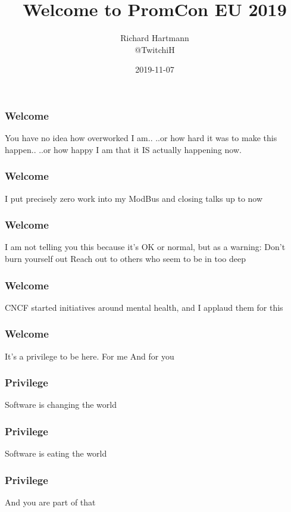 \documentclass[aspectratio=169]{beamer}
\title{Welcome to PromCon EU 2019}
\subtitle{}
\author{Richard Hartmann\\
@TwitchiH}
\date{2019-11-07}
\begin{document}



\begin{frame}
	\titlepage
\end{frame}

\begin{frame}
	\frametitle{Welcome}
	\centering
	\vfill
	You have no idea how overworked I am..
	\vfill
	..or how hard it was to make this happen..
	\vfill
	..or how happy I am that it IS actually happening now.
	\vfill
\end{frame}

\begin{frame}
	\frametitle{Welcome}
	\centering
	\vfill
	I put precisely zero work into my ModBus and closing talks up to now
	\vfill
\end{frame}

\begin{frame}
	\frametitle{Welcome}
	\centering
	\vfill
	I am not telling you this because it's OK or normal, but as a warning:
	\vfill
	Don't burn yourself out
	\vfill
	Reach out to others who seem to be in too deep
	\vfill
\end{frame}


\begin{frame}
	\frametitle{Welcome}
	\centering
	\vfill
	CNCF started initiatives around mental health, and I applaud them for this
	\vfill
\end{frame}
\begin{frame}
	\frametitle{Welcome}
	\centering
	\vfill
	It's a privilege to be here.
	\vfill
	For me
	\vfill
	And for you
	\vfill
\end{frame}

\begin{frame}
	\frametitle{Privilege}
	\centering
	\vfill
	Software is changing the world
	\vfill
\end{frame}

\begin{frame}
	\frametitle{Privilege}
	\centering
	\vfill
	Software is eating the world
	\vfill
\end{frame}

\begin{frame}
	\frametitle{Privilege}
	\centering
	\vfill
	And you are part of that
	\vfill
\end{frame}
\end{document}
